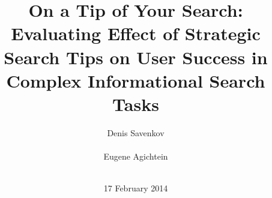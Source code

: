 \documentclass{sig-alternate}
\begin{document}
%

\title{On a Tip of Your Search: Evaluating Effect of Strategic Search Tips on User Success in Complex Informational Search Tasks}

%
%
%
%
%


\author{
\alignauthor
Denis Savenkov\\
       \\
\alignauthor
Eugene Agichtein\\
       \\
}
\date{17 February 2014}
\end{document}

